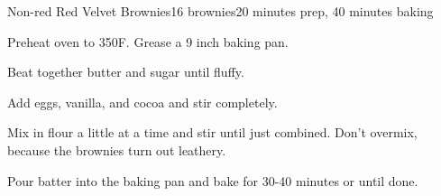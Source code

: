 \documentclass[../Cookbook.tex]{subfiles}
\begin{document}
\begin{recipe}{Non-red Red Velvet Brownies}{16 brownies}{20 minutes prep, 40 minutes baking}

Preheat oven to 350\0F. Grease a 9 inch baking pan.

Beat together butter and sugar until fluffy.

Add eggs, vanilla, and cocoa and stir completely.

Mix in flour a little at a time and stir until just combined.
Don't overmix, because the brownies turn out leathery.

\newstep
Pour batter into the baking pan and bake for 30-40 minutes or until done.

\end{recipe}
\end{document}
